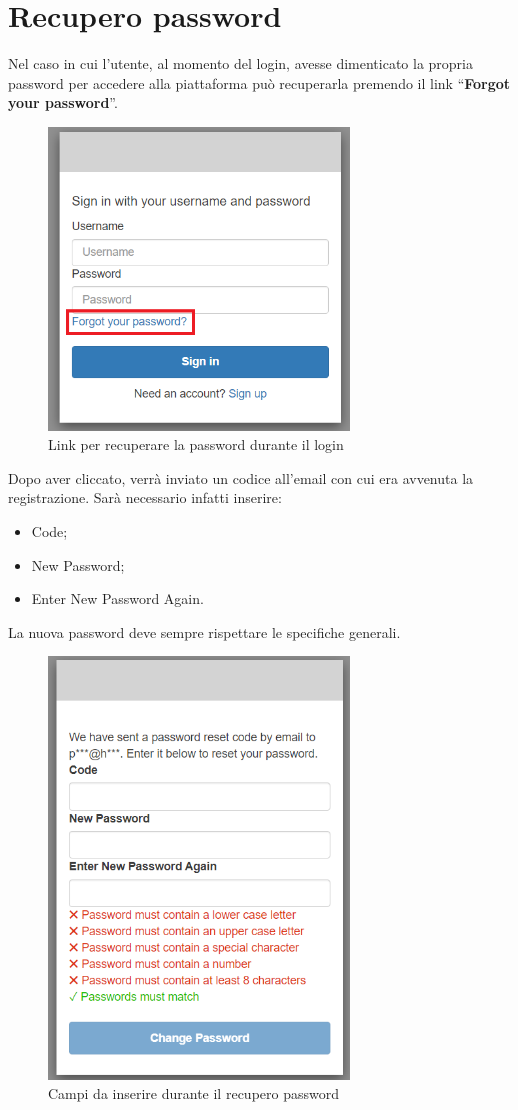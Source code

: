 \section{Recupero password} {
    Nel caso in cui l'utente, al momento del login, avesse dimenticato la propria password per accedere alla piattaforma 
    \platform{} può recuperarla premendo il link ``\textbf{Forgot your password}''. 
    \begin{figure}[H]
        \includegraphics[width=8cm]{sezioni/images/psw-forgot.png}
        \centering
        \caption{Link per recuperare la password durante il login}
    \end{figure}

    Dopo aver cliccato, verrà inviato un codice all'email con cui era avvenuta la registrazione. Sarà necessario infatti inserire: 
    \begin{itemize}
        \item Code;
        \item New Password;
        \item Enter New Password Again.
    \end{itemize} 
    La nuova password deve sempre rispettare le specifiche generali.
    \begin{figure}[H]
        \includegraphics[width=8cm]{sezioni/images/rec-psw.png}
        \centering
        \caption{Campi da inserire durante il recupero password}
    \end{figure}
}
